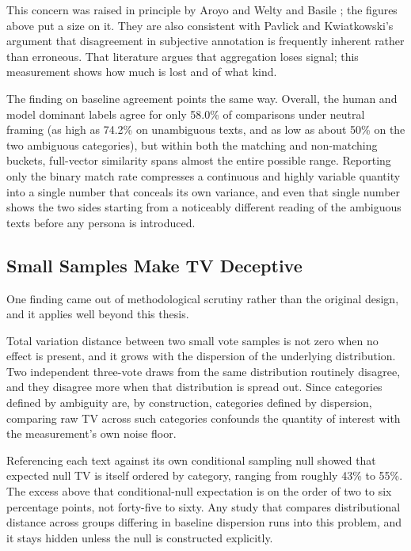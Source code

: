 This concern was raised in principle by Aroyo and Welty \citeyear{Aroyo2015CrowdTruth} and Basile
\citeyear{Basile2020GoldStandard}; the figures above put a size on it. They are also consistent with
Pavlick and Kwiatkowski's \citeyear{Pavlick2019InherentDisagreement} argument that disagreement in
subjective annotation is frequently inherent rather than erroneous. That literature argues that
aggregation loses signal; this measurement shows how much is lost and of what kind.

The finding on baseline agreement points the same way. Overall, the human and model dominant
labels agree for only 58.0\% of comparisons under neutral framing (as high as 74.2\% on
unambiguous texts, and as low as about 50\% on the two ambiguous categories), but within both the
matching and non-matching buckets, full-vector similarity spans almost the entire possible range.
Reporting only the binary match rate compresses a continuous and highly variable quantity into a
single number that conceals its own variance, and even that single number shows the two sides
starting from a noticeably different reading of the ambiguous texts before any persona is
introduced.

\subsection{Small Samples Make TV Deceptive}
\label{disc:smallsample}

\noindent
One finding came out of methodological scrutiny rather than the original design, and it applies
well beyond this thesis.

Total variation distance between two small vote samples is not zero when no effect is present, and
it grows with the dispersion of the underlying distribution. Two independent three-vote draws from
the same distribution routinely disagree, and they disagree more when that distribution is spread
out. Since categories defined by ambiguity are, by construction, categories defined by dispersion,
comparing raw TV across such categories confounds the quantity of interest with the measurement's
own noise floor.

Referencing each text against its own conditional sampling null showed that expected null TV is
itself ordered by category, ranging from roughly 43\% to 55\%. The excess above that
conditional-null expectation is on the order of two to six percentage points, not forty-five to
sixty. Any study that compares distributional distance across groups differing in baseline
dispersion runs into this problem, and it stays hidden unless the null is constructed explicitly.

